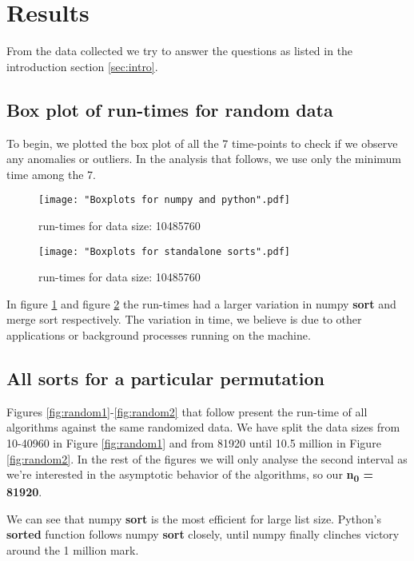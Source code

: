 \documentclass[sigconf, nonacm, natbib, screen, balance=False]{acmart}
\begin{document}
\section{Results}\label{sec:results}
From the data collected we try to answer the questions as listed in the introduction section \ref{sec:intro}.

\subsection{Box plot of run-times for random data }\label{scatter}
To begin, we plotted the box plot of all the 7 time-points to check if we observe any anomalies or outliers. In the analysis that follows, we use only the minimum time among the 7.

\begin{figure}[ht]
\texttt{[image: "Boxplots for numpy and python".pdf]}
    \caption{run-times for data size: 10485760 }
    \label{fig:box1}
\end{figure}

\begin{figure}[ht]
\texttt{[image: "Boxplots for standalone sorts".pdf]}
    \caption{run-times for data size: 10485760  }
    \label{fig:box2}
\end{figure}

In figure \ref{fig:box1} and figure \ref{fig:box2} the run-times had a larger variation in numpy \textbf{sort} and merge sort respectively. The variation in time, we believe is due to other applications or background processes running on the machine.

\subsection{All sorts for a particular permutation }\label{allsorts}

Figures \ref{fig:random1}-\ref{fig:random2} that follow present the run-time of all algorithms against the same randomized data. We have split the data sizes from 10-40960 in Figure \ref{fig:random1} and from 81920 until 10.5 million in Figure \ref{fig:random2}. In the rest of the figures we will only analyse the second interval as we're interested in the asymptotic behavior of the algorithms, so our \textbf{n\textsubscript{0} = 81920}.

We can see that numpy \textbf{sort} is the most efficient for large list size. Python's \textbf{sorted} function follows numpy \textbf{sort} closely, until numpy finally clinches victory around the 1 million mark.
\end{document}
